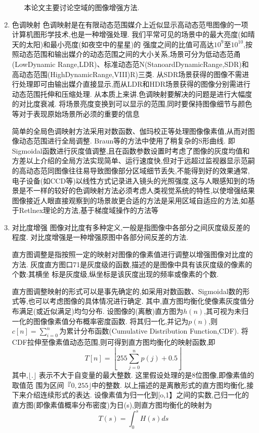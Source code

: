 \documentclass{amsart}
\begin{document}
\begin{enumerate}
\begin{enumerate}
本论文主要讨论空域的图像增强方法.
\end{enumerate}
\item 色调映射
  色调映射是在有限动态范围媒介上近似显示高动态范甩图像的一项计算机图形学技术,也是一种增强处理.
我们平常可见的场景中的最大亮度(如晴天的太阳)和最小亮度(如夜空中的星星)的
强度之间的比值可高达$10^9$至$10^{10}$,按照动态范围和输出媒介的动态范围之间的大小关系,场景可分为低动态范甬(LowDynamic Range,LDR)、标准动态范N(StanoardDynamicRange,SDR)和高动态范围(HighDynamicRange,VIII)R)三类.
从SDR场景获得的图像不需进行处理即可由输出媒介直接显示,而从LDR和HDR场景获得的图像分别需进行动态范围托伸和压缩处理.
从本质上来讲.色调映射要解决的问题是进行大幅度的对比度衰减.
将场景亮度变换到可以显示的范围,同时要保持图像细节与颜色等对于表现原始场景所必须的重要的信息

简单的全局色调映射方法采用对数函数、伽玛校正等处理图像像素值,从而对图像动态范围进行全局调整.
Braun等的方法中使用了稍复杂的S形曲线.
即Sigmoidal函数进行灰度值调整,且在函数参数设置时考虑了图像的灰度均值和方差以上介绍的全局方法实现简单、运行速度快,但对于远超过监视器显示范嗣的高动态范同图像往往易导致图像部分区域细节丢失,不能得到好的效果通常,电子设备(如CCD等)以线性方式记录进入镜头的光照强度,这与人眼感知到的场景是不一样的较好的色调映射方法必须考虑人类视觉系统的特性,以使增强结果图像接近人眼直接观察到的场景故更合适的方法是采用区域自适应的方法,如基于Retlnex理论的方法,基于梯度域操作的方法等
\item 对比度增强
  图像对比度有多种定义,一般是指图像中各部分之间灰度级反差的程度.
  对比度增强是一种增强原图中各部分间反差的方法.


  直方图调整是指按照一定的映射对图像的像素值进行调整以增强图像对比度的方法.
  灰度直方图口71是灰度级的函数,描述的是图像中具有该灰度级的像素的个数:其横坐
  标是灰度级,纵坐标是该灰度出现的频率或像素的个数.


  直方图调整映射的形式可以是事先确定的,如采用对数函数、Sigmoidal数的形式等,也可以考虑图像的具体情况进行确定.
  其中,直方图均衡化使像素灰度值分布满足(或近似满足)均匀分布.
  设图像的(离散)直方图为$h(n)$,其可视为未归一化的图像像素值分布概率密度函数.
  将其归一化,并记为$p(n)$,则$c[n]=\sum_{i=0}^n$为累计分布函数(Cumulative Distribution Function,CDF).
  将CDF拉伸至像素值动态范围,则可得到直方图均衡化的映射函数,即
  \begin{equation}
    \label{eq:11}
    T[n]=\left\lfloor 255 \sum_{j=0}^{n} p(j)+0.5\right\rfloor
  \end{equation}
  其中,$\lfloor.\rfloor$ 表示不大于自变量的最大整数.
  这里假设处理的是8位图像,即像素值的取值范
  围为区间$『0,255\rfloor$中的整数.
  以上描述的是离散形式的直方图均衡化,接下来介绍连续形式的表达.
  设像素值为归一化到[o,1】之间的实数,己归一化的直方图(即像素值概率分布密度)为日(s),则直方图均衡化的映射为
  \begin{equation}
    \label{eq:12}
   T(s)=\int_{0}^s H(s) d s
  \end{equation}



\end{enumerate}
\end{document}
